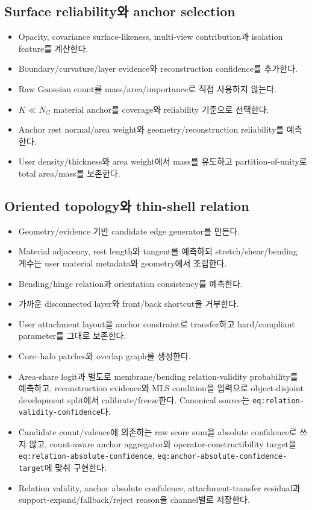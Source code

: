 \documentclass[10pt,a4paper]{article}
\newcommand{\todo}{\textcolor{TodoGray}{\(\square\)}}
\newcommand{\code}[1]{\texttt{#1}}
\begin{document}
\subsection*{Surface reliability와 anchor selection}

\begin{itemize}
  \item[\todo] Opacity, covariance surface-likeness, multi-view contribution과 isolation feature를 계산한다.
  \item[\todo] Boundary/curvature/layer evidence와 reconstruction confidence를 추가한다.
  \item[\todo] Raw Gaussian count를 mass/area/importance로 직접 사용하지 않는다.
  \item[\todo] \(K\ll N_G\) material anchor를 coverage와 reliability 기준으로 선택한다.
  \item[\todo] Anchor rest normal/area weight와 geometry/reconstruction reliability를 예측한다.
  \item[\todo] User density/thickness와 area weight에서 mass를 유도하고 partition-of-unity로 total area/mass를 보존한다.
\end{itemize}

\subsection*{Oriented topology와 thin-shell relation}

\begin{itemize}
  \item[\todo] Geometry/evidence 기반 candidate edge generator를 만든다.
  \item[\todo] Material adjacency, rest length와 tangent를 예측하되 stretch/shear/bending 계수는 user material metadata와 geometry에서 조립한다.
  \item[\todo] Bending/hinge relation과 orientation consistency를 예측한다.
  \item[\todo] 가까운 disconnected layer와 front/back shortcut을 거부한다.
  \item[\todo] User attachment layout을 anchor constraint로 transfer하고 hard/compliant parameter를 그대로 보존한다.
  \item[\todo] Core--halo patches와 overlap graph를 생성한다.
  \item[\todo] Area-share logit과 별도로 membrane/bending relation-validity probability를 예측하고,
  reconstruction evidence와 MLS condition을 입력으로 object-disjoint development split에서 calibrate/freeze한다.
  Canonical source는 \code{eq:relation-validity-confidence}다.
  \item[\todo] Candidate count/valence에 의존하는 raw score sum을 absolute confidence로 쓰지 않고,
  count-aware anchor aggregator와 operator-constructibility target을
  \code{eq:relation-absolute-confidence}, \code{eq:anchor-absolute-confidence-target}에 맞춰 구현한다.
  \item[\todo] Relation validity, anchor absolute confidence, attachment-transfer residual과
  support-expand/fallback/reject reason을 channel별로 저장한다.
\end{itemize}
\end{document}
